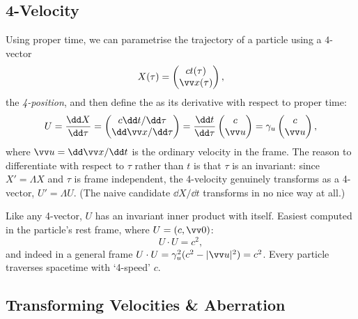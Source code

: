 \subsection{4-Velocity}

Using proper time, we can parametrise the trajectory of a particle using a $4$-vector
$$
X(\tau) = \begin{pmatrix}
	ct(\tau) \\
	\vv x(\tau)
\end{pmatrix},
$$
the \emph{4-position}, and then define the  as its derivative with respect to proper time:
$$
U = \frac{\dd X}{\dd \tau} = \begin{pmatrix}
	c \dd t/\dd\tau \\
	\dd \vv x / \dd \tau
\end{pmatrix}
= \frac{\dd t}{\dd\tau} \begin{pmatrix}
	c \\ \vv u
\end{pmatrix} = \gamma_u \begin{pmatrix}
	c \\ \vv u
\end{pmatrix},
$$
where $\vv u = \dd \vv x/ \dd t$ is the ordinary velocity in the frame. The reason to differentiate with respect to $\tau$ rather than $t$ is that $\tau$ is an invariant: since $X' = \Lambda X$ and $\tau$ is frame independent, the 4-velocity genuinely transforms as a 4-vector, $U' = \Lambda U$. (The naive candidate $\dd X/\dd t$ transforms in no nice way at all.)

Like any 4-vector, $U$ has an invariant inner product with itself. Easiest computed in the particle's rest frame, where $U = (c, \vv 0)$:
$$
U \cdot U = c^2,
$$
and indeed in a general frame $U \cdot U = \gamma_u^2 (c^2 - |\vv u|^2) = c^2$. Every particle traverses spacetime with `4-speed' $c$.

\subsection{Transforming Velocities \& Aberration}

